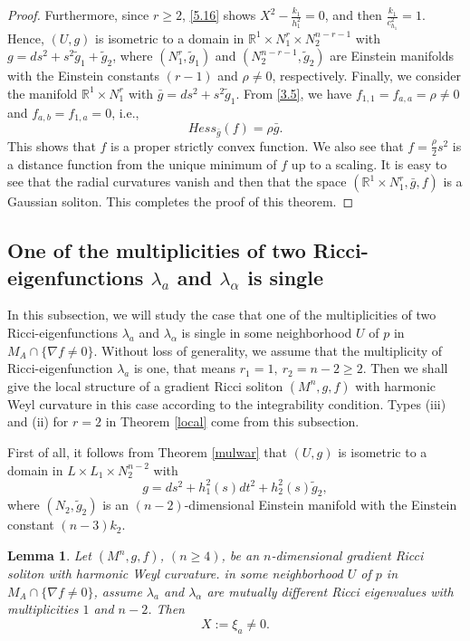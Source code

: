 \documentclass{amsart}
\newtheorem{lemma}[theorem]{Lemma}
\theoremstyle{definition}
\theoremstyle{remark}
\numberwithin{equation}{section}
\begin{document}
\begin{proof}
	 Furthermore, since $r\geq2$, \eqref{5.16} shows $X^2-\frac{k_1}{h^2_1}=0$, and then $\frac{k_1}{c^2_{h_1}}=1$.
	Hence, $(U,g)$ is isometric to a domain in 
	$\mathbb{R}^{1}\times N^{r}_1 \times N^{n-r-1}_2$
	with $g= ds^2 + s^2\tilde{g}_1+\tilde{g}_2 $,
	where $\left(N^{r}_1, \tilde{g}_1\right)$ and $\left(N^{n-r-1}_2, \tilde{g}_2\right)$ 
	are Einstein manifolds with the Einstein constants $(r-1)$ and $\rho\neq 0$, respectively.
	Finally, we consider the manifold $\mathbb{R}^{1}\times N^{r}_1$
	with $\bar{g}=ds^2 + s^2\tilde{g}_1$. From \eqref{3.5}, we have 
	$f_{1,1}=f_{a,a}=\rho\neq0$ and $f_{a,b}=f_{1,a}=0$, i.e.,
	\[
	Hess_{\bar{g}}(f)=\rho\bar{g}.
	\]
	This shows that $f$ is a proper strictly convex function.
	We also see that $f=\frac{\rho}{2}s^2$
	is a distance function from the unique minimum of $f$ up to a scaling. 
	It is easy to see that the radial curvatures vanish and then that
	the space $\left( \mathbb{R}^{1}\times N^{r}_1, \bar{g}, f\right)$ is 
	a Gaussian soliton. 
	This completes the proof of this theorem. 
\end{proof}




	\subsection{One of the multiplicities of two Ricci-eigenfunctions $\lambda_a$ and $\lambda_\alpha$ is single}
In this subsection, we will study the case 
that one of the multiplicities of two Ricci-eigenfunctions $\lambda_a$ and $\lambda_\alpha$ is single 
 in some neighborhood $U$ of $p$ in $M_A \cap \{ \nabla f \neq 0  \}$.
Without loss of generality, we assume that 
the multiplicity of Ricci-eigenfunction $\lambda_a$ is one, that means $r_1=1,~r_2=n-2\geq2$.
Then we shall give the local structure of a gradient Ricci soliton 
$\left(M^n, g, f \right) $ with harmonic Weyl curvature 
in this case according to the integrability condition.
Types {\rm (iii)} and {\rm (ii)} for $r=2$ in Theorem \ref{local} come from this subsection.

\smallskip
First of all, it follows from Theorem \ref{mulwar} that 
$(U,g)$ is isometric to a domain in 
$ L\times L_1 \times N^{n-2}_2$
with
\[
g= ds^2 + h^2_1(s)dt^2+h^2_2(s) \tilde{g}_{2}, 
\]
where $(N_2, \tilde{g}_{2})$ is an $(n-2)$-dimensional Einstein manifold 
with the Einstein constant $(n-3)k_2$.

\begin{lemma}\label{lemma5.5}
	Let $(M^n, g, f)$, $(n\geq 4)$, be an $n$-dimensional gradient Ricci soliton with harmonic Weyl curvature.
	in some neighborhood $U$ of $p$ in $M_A \cap \{ \nabla f \neq 0  \}$, 
	assume $\lambda_a$ and $\lambda_\alpha$ are mutually different Ricci eigenvalues with multiplicities $1$ and $n-2$.
	 Then 
	 \[
	 X:=\xi_a\neq0.
	 \] 
\end{lemma}
\end{document}
